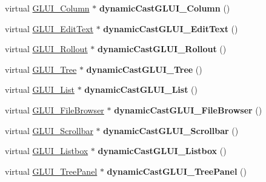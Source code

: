 \begin{DoxyCompactItemize}
\item 
\hypertarget{class_g_l_u_i___node_a1d4b5015ba6ef7561b85165be9e08f4a}{virtual \hyperlink{class_g_l_u_i___column}{G\+L\+U\+I\+\_\+\+Column} $\ast$ {\bfseries dynamic\+Cast\+G\+L\+U\+I\+\_\+\+Column} ()}\label{class_g_l_u_i___node_a1d4b5015ba6ef7561b85165be9e08f4a}

\item 
\hypertarget{class_g_l_u_i___node_a4298955cf5255a5037aca75e96c74be1}{virtual \hyperlink{class_g_l_u_i___edit_text}{G\+L\+U\+I\+\_\+\+Edit\+Text} $\ast$ {\bfseries dynamic\+Cast\+G\+L\+U\+I\+\_\+\+Edit\+Text} ()}\label{class_g_l_u_i___node_a4298955cf5255a5037aca75e96c74be1}

\item 
\hypertarget{class_g_l_u_i___node_a3dfd8de5f75e9118682296ef9578691f}{virtual \hyperlink{class_g_l_u_i___rollout}{G\+L\+U\+I\+\_\+\+Rollout} $\ast$ {\bfseries dynamic\+Cast\+G\+L\+U\+I\+\_\+\+Rollout} ()}\label{class_g_l_u_i___node_a3dfd8de5f75e9118682296ef9578691f}

\item 
\hypertarget{class_g_l_u_i___node_a898be8609d99c79d3d65caf67326b82c}{virtual \hyperlink{class_g_l_u_i___tree}{G\+L\+U\+I\+\_\+\+Tree} $\ast$ {\bfseries dynamic\+Cast\+G\+L\+U\+I\+\_\+\+Tree} ()}\label{class_g_l_u_i___node_a898be8609d99c79d3d65caf67326b82c}

\item 
\hypertarget{class_g_l_u_i___node_add6ae8a73e3317cb0dda876df33cd100}{virtual \hyperlink{class_g_l_u_i___list}{G\+L\+U\+I\+\_\+\+List} $\ast$ {\bfseries dynamic\+Cast\+G\+L\+U\+I\+\_\+\+List} ()}\label{class_g_l_u_i___node_add6ae8a73e3317cb0dda876df33cd100}

\item 
\hypertarget{class_g_l_u_i___node_a193ff2616a8ab4ee8c0d841abd82f8dc}{virtual \hyperlink{class_g_l_u_i___file_browser}{G\+L\+U\+I\+\_\+\+File\+Browser} $\ast$ {\bfseries dynamic\+Cast\+G\+L\+U\+I\+\_\+\+File\+Browser} ()}\label{class_g_l_u_i___node_a193ff2616a8ab4ee8c0d841abd82f8dc}

\item 
\hypertarget{class_g_l_u_i___node_af90b9c17501dc4907613bec3a23925f8}{virtual \hyperlink{class_g_l_u_i___scrollbar}{G\+L\+U\+I\+\_\+\+Scrollbar} $\ast$ {\bfseries dynamic\+Cast\+G\+L\+U\+I\+\_\+\+Scrollbar} ()}\label{class_g_l_u_i___node_af90b9c17501dc4907613bec3a23925f8}

\item 
\hypertarget{class_g_l_u_i___node_a1612f02aa74dafe4df916b01ddbe6b14}{virtual \hyperlink{class_g_l_u_i___listbox}{G\+L\+U\+I\+\_\+\+Listbox} $\ast$ {\bfseries dynamic\+Cast\+G\+L\+U\+I\+\_\+\+Listbox} ()}\label{class_g_l_u_i___node_a1612f02aa74dafe4df916b01ddbe6b14}

\item 
\hypertarget{class_g_l_u_i___node_afb6f9a1353e96853b6324c87c9db7ccd}{virtual \hyperlink{class_g_l_u_i___tree_panel}{G\+L\+U\+I\+\_\+\+Tree\+Panel} $\ast$ {\bfseries dynamic\+Cast\+G\+L\+U\+I\+\_\+\+Tree\+Panel} ()}\label{class_g_l_u_i___node_afb6f9a1353e96853b6324c87c9db7ccd}

\end{DoxyCompactItemize}
